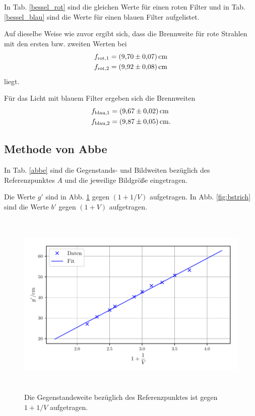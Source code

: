 \noindent In Tab. \ref{bessel_rot} sind die gleichen Werte für einen roten Filter und in Tab. \ref{bessel_blau} sind die Werte für einen blauen Filter aufgelistet.




\noindent Auf dieselbe Weise wie zuvor ergibt sich, dass die Brennweite für rote Strahlen mit den ersten bzw. zweiten Werten bei 
\begin{align*}
    f_\text{rot,1} &= \SI{9.70 \pm 0.07}{\centi\meter} \\
    f_\text{rot,2} &= \SI{9.92 \pm 0.08}{\centi\meter}
\end{align*}
liegt.

\noindent Für das Licht mit blauem Filter ergeben sich die Brennweiten
\begin{align*}
    f_\text{blau,1} &= \SI{9.67 \pm 0.02}{\centi\meter} \\
    f_\text{blau,2} &= \SI{9.87 \pm 0.05}{\centi\meter}.
\end{align*}



\subsection{Methode von Abbe}
In Tab. \ref{abbe} sind die Gegenstands- und Bildweiten bezüglich des Referenzpunktes $A$ und die jeweilige Bildgröße eingetragen.



\noindent Die Werte $g'$ sind in Abb. \ref{fig:gstrich} gegen $(1+1/V)$ aufgetragen. In Abb. \ref{fig:bstrich} sind die Werte $b'$ gegen $(1+V)$ aufgetragen.

\begin{figure}
    \centering
    \includegraphics[width=14cm, height=9cm]{build/abbe_g.pdf}
    \caption{Die Gegenstandsweite bezüglich des Referenzpunktes ist gegen $1 + 1 / V$ aufgetragen.}
    \label{fig:gstrich}
\end{figure}

